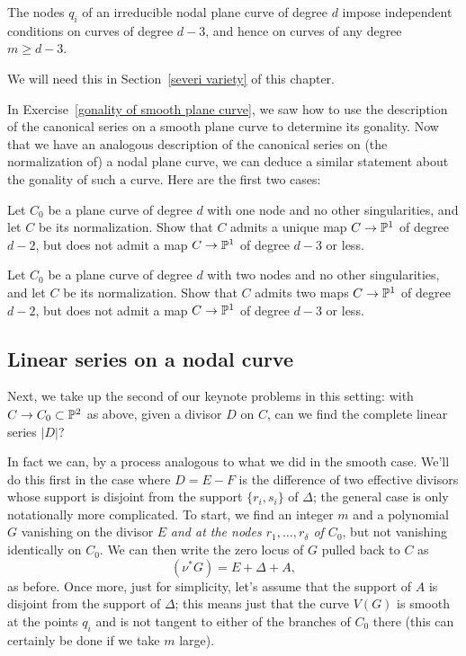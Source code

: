 \begin{lemma}\label{adjoint independent}
The nodes $q_i$ of an irreducible nodal plane curve of degree $d$ impose independent conditions on curves of degree $d-3$, and hence on curves of any degree $m \geq d-3$.
\end{lemma}

We will need this in Section~\ref{severi variety} of this chapter.

In Exercise~\ref{gonality of smooth plane curve}, we saw how to use the description of the canonical series on a smooth plane curve to determine its gonality. Now that we have an analogous description of the canonical series on (the normalization of) a nodal plane curve, we can deduce a similar statement about the gonality of such a curve. Here are the first two cases: 
\begin{exercise}
Let $C_0$ be a plane curve of degree $d$ with one node and no other singularities, and let $C$ be its normalization. Show that $C$ admits a unique map $C \to {\mathbb P}^1$ of degree $d-2$, but does not admit a map $C \to {\mathbb P}^1$ of degree $d-3$ or less.
\end{exercise}

\begin{exercise}
Let $C_0$ be a plane curve of degree $d$ with two nodes and no other singularities, and let $C$ be its normalization. Show that $C$ admits two maps $C \to {\mathbb P}^1$ of degree $d-2$, but does not admit a map $C \to {\mathbb P}^1$ of degree $d-3$ or less.
\end{exercise}


\subsection{Linear series on a nodal curve}

Next, we take up the second of our keynote problems in this setting: with $C \to C_0 \subset {\mathbb P}^2$ as above, given a divisor $D$ on $C$, can we find the complete linear series $|D|$?

In fact we can, by a process analogous to what we did in the smooth case. We'll do this first in the case where $D = E-F$ is the difference of two effective divisors whose support is disjoint from the support $\{r_i, s_i\}$ of $\Delta$; the general case is only notationally more complicated. To start, we find an integer $m$ and a polynomial $G$ vanishing on the divisor $E$ \emph{and at the nodes $r_1,\dots,r_\delta$ of $C_0$}, but not vanishing identically on $C_0$. We can then write the zero locus of $G$ pulled back to $C$ as
$$
(\nu^*G) = E + \Delta + A,
$$
as before. Once more, just for simplicity, let's assume that the support of $A$ is disjoint from the support of $\Delta$; this means just that the curve $V(G)$ is smooth at the points $q_i$ and is not tangent to either of the branches of $C_0$ there (this can certainly be done if we take $m$ large).


